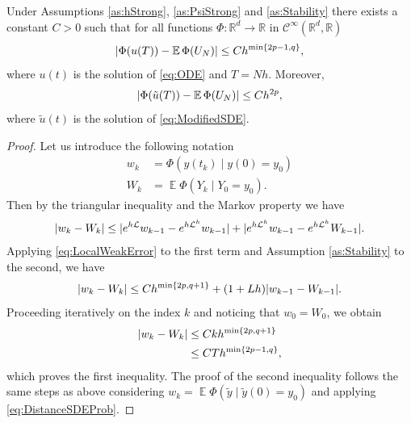 \documentclass{siamart1116}
\numberwithin{theorem}{section}
\DeclarePairedDelimiter{\abs}{\lvert}{\rvert}
\newcommand{\R}{\mathbb{R}}
\newcommand{\diffL}{\mathcal{L}}
\newcommand{\E}{\operatorname{\mathbb{E}}}
\begin{document}
\begin{theorem}\label{thm:weakOrder} Under Assumptions \ref{as:hStrong}, \ref{as:PsiStrong} and \ref{as:Stability} there exists a constant $C > 0$ such that for all functions $\Phi\colon\R^d\to\R$ in $\mathcal{C}^\infty(\R^d,\R)$
	\begin{equation}
		\abs{\Phi(u(T)) - \E\Phi(U_N)} \leq Ch^{\min\{2p - 1, q\}},
	\end{equation}
	where $u(t)$ is the solution of \eqref{eq:ODE} and $T = Nh$. Moreover, 
	\begin{equation}
		\abs{\Phi(\tilde u(T)) - \E\Phi(U_N)} \leq Ch^{2p},		
	\end{equation}
	where $\tilde u(t)$ is the solution of \eqref{eq:ModifiedSDE}.
\end{theorem}

\begin{proof} Let us introduce the following notation
	\begin{equation}
	\begin{aligned}
		w_k &= \Phi(y(t_k) \mid y(0) = y_0)\\
		W_k &= \E\Phi(Y_k \mid Y_0 = y_0).
	\end{aligned}
	\end{equation}
	Then by the triangular inequality and the Markov property we have
	\begin{equation}
	\begin{aligned}
		\abs{w_k - W_k} \leq \abs{e^{h\diffL}w_{k-1} - e^{h\diffL^h}w_{k-1}} + \abs{e^{h\diffL^h}w_{k-1} - e^{h\diffL^h}W_{k-1}}.
	\end{aligned}
	\end{equation}
	Applying \eqref{eq:LocalWeakError} to the first term and Assumption \ref{as:Stability} to the second, we have
	\begin{equation}
		\abs{w_k - W_k} \leq Ch^{\min\{2p, q + 1\}} + (1 + Lh)\abs{w_{k-1} - W_{k-1}}.
	\end{equation} 
	Proceeding iteratively on the index $k$ and noticing that $w_0 = W_0$, we obtain
	\begin{equation}
	\begin{aligned}
		\abs{w_k - W_k} &\leq C k h^{\min\{2p, q + 1\}}\\
		&\leq C T h^{\min\{2p - 1, q\}},	
	\end{aligned}
	\end{equation}
	which proves the first inequality. The proof of the second inequality follows the same steps as above considering $w_k = \E\Phi(\tilde y\mid \tilde y(0) = y_0)$ and applying \eqref{eq:DistanceSDEProb}. 
\end{proof}
\end{document}
